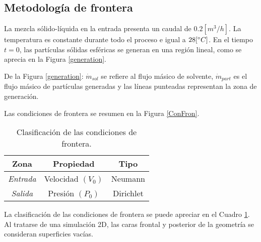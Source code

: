 \subsection{Metodolog\'ia de frontera} \label{CondF}

\noindent
\justify

La mezcla s\'olido-l\'iquida en la entrada presenta un caudal de $0.2 \left[m^3 /h \right]$. La temperatura es constante durante todo el proceso e igual a $28 [\degree C]$. En el tiempo $t=0$, las part\'iculas s\'olidas esf\'ericas se generan en una regi\'on lineal, como se aprecia en la Figura \ref{generation}.



\noindent
\justify

De la Figura \ref{generation}: $\dot{m} _{sol}$ se refiere al flujo m\'asico de solvente, $\dot{m} _{part}$ es el flujo m\'asico de part\'iculas generadas y las l\'ineas punteadas representan la zona de generaci\'on.

\noindent
\justify

Las condiciones de frontera se resumen en la Figura \ref{ConFron}.



\begin{table}[h!]
	\centering
	\begin{tabular}{|c|c|c|}
		\hline
		\textbf{Zona} & \textbf{Propiedad}  & \textbf{Tipo} \\ \hline
		\textit{Entrada} & Velocidad $(V_0)$ & Neumann \\ \hline
		\textit{Salida} & Presi\'on $(P_0)$ & Dirichlet \\ \hline
	\end{tabular}
	\caption{Clasificaci\'on de las condiciones de frontera.}
	\label{CFT}
\end{table}

\noindent
\justify

La clasificaci\'on de las condiciones de frontera se puede apreciar en el Cuadro \ref{CFT}. Al tratarse de una simulaci\'on 2D, las caras frontal y posterior de la geometr\'ia se consideran superficies vac\'ias.